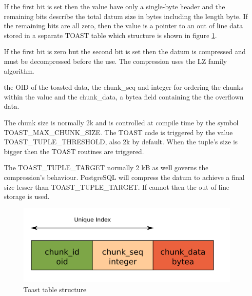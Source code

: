 If the first bit is set then the value have only a single-byte header and the remaining bits 
describe the total datum size in bytes including the length byte. If the remaining bits are all 
zero, then the value is a pointer to an out of line data stored in a separate TOAST table which 
structure is shown in figure \ref{fig:TOAST01}.\newline

If the first bit is zero but the second bit is set then the datum is compressed and must be 
decompressed before the use. The compression uses the LZ family algorithm.\newline

the OID of the toasted data, the chunk\_seq and integer for ordering the chunks 
within the value and the chunk\_data, a bytea field containing the the 
overflown data.\newline 

The chunk size is normally 2k and is controlled at compile time by the symbol 
TOAST\_MAX\_CHUNK\_SIZE. The TOAST code is triggered by the value TOAST\_TUPLE\_THRESHOLD, also 2k 
by default. When the tuple's size is bigger then the TOAST routines are triggered.\newline

The TOAST\_TUPLE\_TARGET normally 2 kB as well governs the compression's behaviour. PostgreSQL will 
compress the datum to achieve a final size lesser than TOAST\_TUPLE\_TARGET. If cannot then the out 
of line storage is used.

\begin{figure}[H]
\begin{center}

\includegraphics[scale=0.55]{images/toast_01.png}

\caption{Toast table structure}
\label{fig:TOAST01} 
\end{center}

\end{figure}

